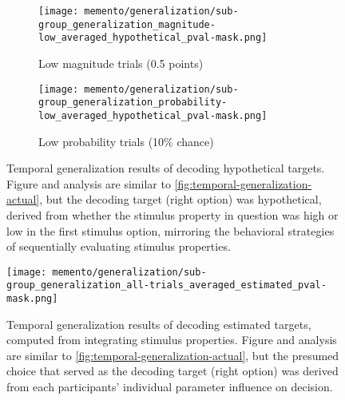 \begin{figure}
	\begin{subfigure}[c]{0.5\textwidth}
		\texttt{[image: memento/generalization/sub-group\_generalization\_magnitude-low\_averaged\_hypothetical\_pval-mask.png]}
		\caption{Low magnitude trials (0.5 points)}
		\label{fig:generalization-mag-low-hypothetical}
	\end{subfigure}
	\begin{subfigure}[c]{0.5\textwidth}
		\texttt{[image: memento/generalization/sub-group\_generalization\_probability-low\_averaged\_hypothetical\_pval-mask.png]}
		\caption{Low probability trials (10\% chance)}
		\label{fig:generalization-prob-low-hypothetical}
	\end{subfigure}
	\caption[Temporal generalization: Hypothetical choice]{Temporal generalization results of decoding hypothetical targets. Figure and analysis are similar to \ref{fig:temporal-generalization-actual}, but the decoding target (right option) was hypothetical, derived from whether the stimulus property in question was high or low in the first stimulus option, mirroring the behavioral strategies of sequentially evaluating stimulus properties.}
	\label{fig:temporal-generalization-hypothetical}
\end{figure}

\begin{figure}
	\centering
	\texttt{[image: memento/generalization/sub-group\_generalization\_all-trials\_averaged\_estimated\_pval-mask.png]}
	\caption[Temporal generalization: Estimated choice]{Temporal generalization results of decoding estimated targets, computed from integrating stimulus properties. Figure and analysis are similar to \ref{fig:temporal-generalization-actual}, but the presumed choice that served as the decoding target (right option) was derived from each participants' individual parameter influence on decision.}
	\label{fig:temporal-generalization-estimated}
\end{figure}


